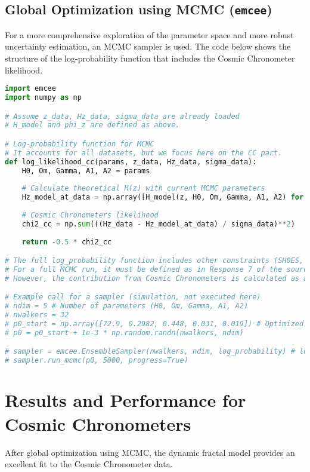 \documentclass{article}
\begin{document}
\subsection{Global Optimization using MCMC (\texttt{emcee})}
For a more comprehensive exploration of the parameter space and more robust uncertainty estimation, an MCMC sampler is used. The code below shows the structure of the log-probability function that includes the Cosmic Chronometer likelihood.

\begin{lstlisting}[language=Python, caption=Integrating CC likelihood into MCMC]
import emcee
import numpy as np

# Assume z_data, Hz_data, sigma_data are already loaded
# H_model and phi_z are defined as above.

# Log-probability function for MCMC
# It accounts for all datasets, but we focus here on the CC part.
def log_likelihood_cc(params, z_data, Hz_data, sigma_data):
    H0, Om, Gamma, A1, A2 = params
    
    # Calculate theoretical H(z) with current MCMC parameters
    Hz_model_at_data = np.array([H_model(z, H0, Om, Gamma, A1, A2) for z in z_data])
    
    # Cosmic Chronometers likelihood
    chi2_cc = np.sum(((Hz_data - Hz_model_at_data) / sigma_data)**2)
    
    return -0.5 * chi2_cc

# The full log_probability function includes other constraints (SH0ES, BBN, BAO)
# For a full MCMC run, it must be defined as in Response 7 of the source document.
# However, the contribution from Cosmic Chronometers is calculated as above.

# Example call for a sampler (simulation, not executed here)
# ndim = 5 # Number of parameters (H0, Om, Gamma, A1, A2)
# nwalkers = 32
# p0_start = np.array([72.9, 0.2982, 0.448, 0.031, 0.019]) # Optimized initial parameters
# p0 = p0_start + 1e-3 * np.random.randn(nwalkers, ndim)

# sampler = emcee.EnsembleSampler(nwalkers, ndim, log_probability) # log_probability is the full function
# sampler.run_mcmc(p0, 5000, progress=True)
\end{lstlisting}

\section{Results and Performance for Cosmic Chronometers}
After global optimization using MCMC, the dynamic fractal model provides an excellent fit to the Cosmic Chronometer data.
\end{document}
